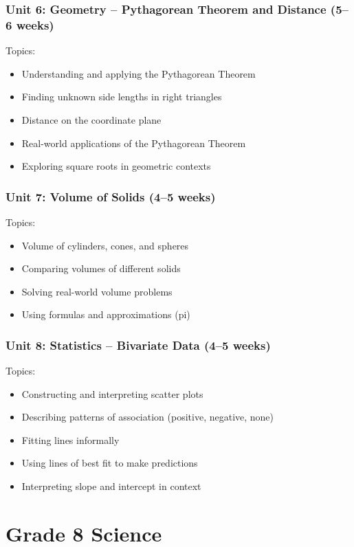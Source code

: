 \documentclass[11pt,letterpaper]{report}
\begin{document}
\subsection{Unit 6: Geometry – Pythagorean Theorem and Distance (5–6 weeks)}

Topics:
\begin{itemize}
\item Understanding and applying the Pythagorean Theorem
\item Finding unknown side lengths in right triangles
\item Distance on the coordinate plane
\item Real-world applications of the Pythagorean Theorem
\item Exploring square roots in geometric contexts
\end{itemize}

\subsection{Unit 7: Volume of Solids (4–5 weeks)}

Topics:
\begin{itemize}
\item Volume of cylinders, cones, and spheres
\item Comparing volumes of different solids
\item Solving real-world volume problems
\item Using formulas and approximations (pi)
\end{itemize}

\subsection{Unit 8: Statistics – Bivariate Data (4–5 weeks)}

Topics:
\begin{itemize}
\item Constructing and interpreting scatter plots
\item Describing patterns of association (positive, negative, none)
\item Fitting lines informally
\item Using lines of best fit to make predictions
\item Interpreting slope and intercept in context
\end{itemize}


\chapter{Grade 8 Science}
\end{document}
